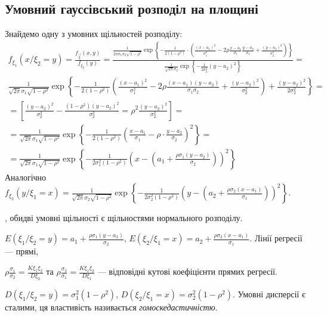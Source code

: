 \subsection{Умовний гауссівський розподіл на площині}
Знайдемо одну з умовних щільностей розподілу:
\begin{gather*}
    f_{\xi_1}(x/\xi_2 = y) = \frac{f_{\vec{\xi}}(x,y)}{f_{\xi_2}(y)} = 
    \frac{\frac{1}{2\pi\sigma_1\sigma_2\sqrt{1-\rho^2}} \exp\left\{
        -\frac{1}{2(1-\rho^2)}\cdot
        \left(\frac{(x-a_1)^2}{\sigma_1^2} -
        2\rho\frac{x-a_1}{\sigma_1}\frac{y-a_2}{\sigma_2} +
        \frac{(y-a_2)^2}{\sigma_2^2}
        \right)\right\} }{
            \frac{1}{\sqrt{2\pi}\sigma_2} \exp\left\{-\frac{1}{2\sigma_2^2}(y-a_2)^2\right\}
        } = \\
        \frac{1}{\sqrt{2\pi}\sigma_1\sqrt{1-\rho^2}} \exp\left\{
            -\frac{1}{2(1-\rho^2)}
        \left(\frac{(x-a_1)^2}{\sigma_1^2} -
        2\rho\frac{(x-a_1)(y-a_2)}{\sigma_1\sigma_2} +
        \frac{(y-a_2)^2}{\sigma_2^2}
        \right) +
        \frac{(y-a_2)^2}{2\sigma_2^2}
        \right\} = \\
        = \left [ \frac{(y-a_2)^2}{\sigma_2^2} - \frac{(1-\rho^2)(y-a_2)^2}{\sigma_2^2} = \rho^2 \frac{(y-a_2)^2}{\sigma_2^2}\right]=\\
        = \frac{1}{\sqrt{2\pi}\sigma_1\sqrt{1-\rho^2}} \exp\left\{-\frac{1}{2(1-\rho^2)}\left( \frac{x-a_1}{\sigma_1} - \rho\cdot\frac{y-a_2}{\sigma_2}\right)^2\right\} = \\
        = \frac{1}{\sqrt{2\pi}\sigma_1\sqrt{1-\rho^2}} \exp\left\{-\frac{1}{2\sigma_1^2(1-\rho^2)}\left( x- \left( a_1 + \frac{\rho\sigma_1(y-a_2)}{\sigma_2}\right)\right)^2\right\}
\end{gather*}
Аналогічно $f_{\xi_2}(y/\xi_1 = x) = \frac{1}{\sqrt{2\pi}\sigma_2\sqrt{1-\rho^2}} \exp\left\{-\frac{1}{2\sigma_2^2(1-\rho^2)}\left( y- \left( a_2 + \frac{\rho\sigma_2(x-a_1)}{\sigma_1}\right)\right)^2\right\}$.

, обидві умовні щільності є щільностями нормального розподілу.

$E\left( \xi_1 / \xi_2 = y\right) = a_1 + \frac{\rho\sigma_1(y-a_2)}{\sigma_2}$, 
$E\left( \xi_2 / \xi_1 = x\right) = a_2 + \frac{\rho\sigma_2(x-a_1)}{\sigma_1}$. Лінії регресії --- прямі,

\noindent
$\rho\frac{\sigma_1}{\sigma_2} = \frac{K\xi_1\xi_2}{D\xi_2}$ та $\rho\frac{\sigma_2}{\sigma_1}  = \frac{K\xi_1\xi_2}{D\xi_1}$ --- відповідні кутові коефіцієнти прямих регресії.

$D\left( \xi_1 / \xi_2 = y\right) = \sigma_1^2(1-\rho^2)$, 
$D\left( \xi_2 / \xi_1 = x\right) = \sigma_2^2(1-\rho^2)$. Умовні дисперсії є сталими, ця властивість називається \emph{гомоскедастичністю}.